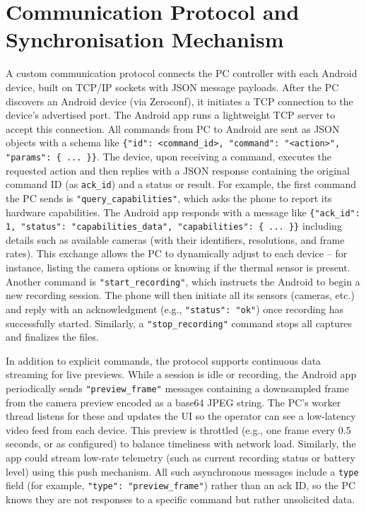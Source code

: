 \section{Communication Protocol and Synchronisation Mechanism}\label{sec:4-4}
A custom communication protocol connects the PC controller with each Android device, built on TCP/IP sockets \cite{ref21} with JSON message payloads. After the PC discovers an Android device (via Zeroconf), it initiates a TCP connection to the device's advertised port. The Android app runs a lightweight TCP server to accept this connection. All commands from PC to Android are sent as JSON objects with a schema like \texttt{\{"id": <command\_id>, "command": "<action>", "params": \{ ... \}\}}. The device, upon receiving a command, executes the requested action and then replies with a JSON response containing the original command ID (as \texttt{ack\_id}) and a status or result. For example, the first command the PC sends is \texttt{"query\_capabilities"}, which asks the phone to report its hardware capabilities. The Android app responds with a message like \texttt{\{"ack\_id": 1, "status": "capabilities\_data", "capabilities": \{ ... \}\}} including details such as available cameras (with their identifiers, resolutions, and frame rates). This exchange allows the PC to dynamically adjust to each device -- for instance, listing the camera options or knowing if the thermal sensor is present. Another command is \texttt{"start\_recording"}, which instructs the Android to begin a new recording session. The phone will then initiate all its sensors (cameras, etc.) and reply with an acknowledgment (e.g., \texttt{"status": "ok"}) once recording has successfully started. Similarly, a \texttt{"stop\_recording"} command stops all captures and finalizes the files.

In addition to explicit commands, the protocol supports continuous data streaming for live previews. While a session is idle or recording, the Android app periodically sends \texttt{"preview\_frame"} messages containing a downsampled frame from the camera preview encoded as a base64 JPEG string. The PC's worker thread listens for these and updates the UI so the operator can see a low-latency video feed from each device. This preview is throttled (e.g., one frame every 0.5 seconds, or as configured) to balance timeliness with network load. Similarly, the app could stream low-rate telemetry (such as current recording status or battery level) using this push mechanism. All such asynchronous messages include a \texttt{type} field (for example, \texttt{"type": "preview\_frame"}) rather than an ack ID, so the PC knows they are not responses to a specific command but rather unsolicited data.

